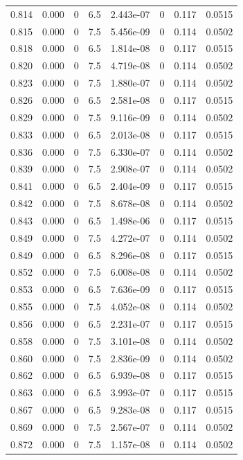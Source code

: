 \documentclass[preview]{standalone}
\begin{document}
{{{{{{{{{{\begin{tabular}{L{1.2cm}C{1.2cm} C{0.3cm}C{0.5cm} C{1.4cm}C{1.4cm} C{1.4cm}C{1.4cm}}
  0.814  &  0.000  & 0     & 6.5 &  2.443e-07  & 0  & 0.117 &  0.0515   \\ 
  0.815  &  0.000  & 0     & 7.5 &  5.456e-09  & 0  & 0.114 &  0.0502   \\ 
  0.818  &  0.000  & 0     & 6.5 &  1.814e-08  & 0  & 0.117 &  0.0515   \\ 
  0.820  &  0.000  & 0     & 7.5 &  4.719e-08  & 0  & 0.114 &  0.0502   \\ 
  0.823  &  0.000  & 0     & 7.5 &  1.880e-07  & 0  & 0.114 &  0.0502   \\ 
  0.826  &  0.000  & 0     & 6.5 &  2.581e-08  & 0  & 0.117 &  0.0515   \\ 
  0.829  &  0.000  & 0     & 7.5 &  9.116e-09  & 0  & 0.114 &  0.0502   \\ 
  0.833  &  0.000  & 0     & 6.5 &  2.013e-08  & 0  & 0.117 &  0.0515   \\ 
  0.836  &  0.000  & 0     & 7.5 &  6.330e-07  & 0  & 0.114 &  0.0502   \\ 
  0.839  &  0.000  & 0     & 7.5 &  2.908e-07  & 0  & 0.114 &  0.0502   \\ 
  0.841  &  0.000  & 0     & 6.5 &  2.404e-09  & 0  & 0.117 &  0.0515   \\ 
  0.842  &  0.000  & 0     & 7.5 &  8.678e-08  & 0  & 0.114 &  0.0502   \\ 
  0.843  &  0.000  & 0     & 6.5 &  1.498e-06  & 0  & 0.117 &  0.0515   \\ 
  0.849  &  0.000  & 0     & 7.5 &  4.272e-07  & 0  & 0.114 &  0.0502   \\ 
  0.849  &  0.000  & 0     & 6.5 &  8.296e-08  & 0  & 0.117 &  0.0515   \\ 
  0.852  &  0.000  & 0     & 7.5 &  6.008e-08  & 0  & 0.114 &  0.0502   \\ 
  0.853  &  0.000  & 0     & 6.5 &  7.636e-09  & 0  & 0.117 &  0.0515   \\ 
  0.855  &  0.000  & 0     & 7.5 &  4.052e-08  & 0  & 0.114 &  0.0502   \\ 
  0.856  &  0.000  & 0     & 6.5 &  2.231e-07  & 0  & 0.117 &  0.0515   \\ 
  0.858  &  0.000  & 0     & 7.5 &  3.101e-08  & 0  & 0.114 &  0.0502   \\ 
  0.860  &  0.000  & 0     & 7.5 &  2.836e-09  & 0  & 0.114 &  0.0502   \\ 
  0.862  &  0.000  & 0     & 6.5 &  6.939e-08  & 0  & 0.117 &  0.0515   \\ 
  0.863  &  0.000  & 0     & 6.5 &  3.993e-07  & 0  & 0.117 &  0.0515   \\ 
  0.867  &  0.000  & 0     & 6.5 &  9.283e-08  & 0  & 0.117 &  0.0515   \\ 
  0.869  &  0.000  & 0     & 7.5 &  2.567e-07  & 0  & 0.114 &  0.0502   \\ 
  0.872  &  0.000  & 0     & 7.5 &  1.157e-08  & 0  & 0.114 &  0.0502   \\ 
\hline 
\end{tabular} 

}}}}}}}}}}
\end{document}
